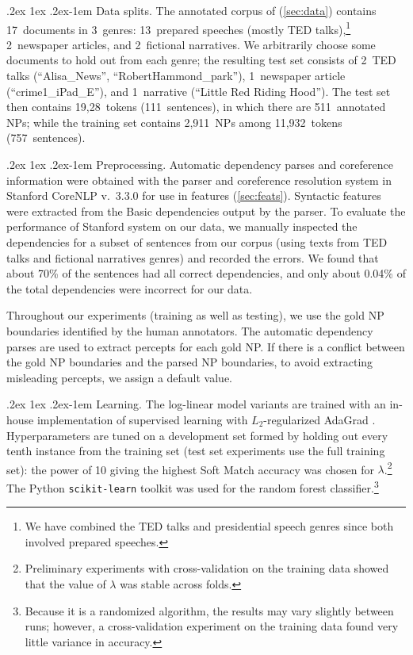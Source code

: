 \documentclass[11pt,letterpaper]{article}
\makeatletter
\renewcommand{\paragraph}{%
  \@startsection{paragraph}{4}%
  {\z@}{.2ex \@plus 1ex \@minus .2ex}{-1em}%
  {\normalfont\normalsize\bfseries}%
}
\makeatother
\begin{document}
\paragraph{Data splits.} The annotated corpus of \citet{bhatia14} (\cref{sec:data}) contains 17~documents 
in 3~genres: 13~prepared speeches (mostly TED talks),\footnote{We have combined the TED talks and presidential speech genres since both involved prepared speeches.} 2~newspaper articles, 
and 2~fictional narratives. We arbitrarily choose some documents to hold out from each genre; 
the resulting test set consists of 2~TED talks (``Alisa\_News'', ``RobertHammond\_park''), 
1~newspaper article (``crime1\_iPad\_E''), and 1~narrative (``Little Red Riding Hood'').
The test set then contains 19,28~tokens (111~sentences), in which there are 511~annotated NPs; 
while the training set contains 2,911~NPs among 11,932~tokens (757~sentences).

\paragraph{Preprocessing.} Automatic dependency parses and coreference information were obtained with 
the parser and coreference resolution system in Stanford CoreNLP v.~3.3.0 \citep{socher-13,recasens-13}
for use in features (\cref{sec:feats}). Syntactic features were extracted from the Basic dependencies output by the parser. 
To evaluate the performance of Stanford system on our data, 
we manually inspected the dependencies for a subset of sentences from our corpus (using texts from TED talks and fictional narratives genres) 
and recorded the errors. 
We found that about 70\% of the sentences had all correct dependencies, and only about 0.04\% of the total dependencies were incorrect for our data.

Throughout our experiments (training as well as testing), we use the gold NP boundaries identified by the human annotators.
The automatic dependency parses are used to extract percepts for each gold NP.     
If there is a conflict between the gold NP boundaries and the parsed NP boundaries, to avoid extracting misleading percepts, 
we assign a default value.  

\paragraph{Learning.} The log-linear model variants are trained with an in-house implementation of supervised learning with $L_2$-regularized AdaGrad \citep{adagrad}.
Hyperparameters are tuned  
on a development set formed by holding out every tenth instance from the training set 
(test set experiments use the full training set):
the power of 10 giving the highest Soft Match accuracy was chosen for $\lambda$.\footnote{Preliminary experiments with cross-validation on the training data showed that the value of $\lambda$ was stable across folds.}
The Python {\tt scikit-learn} toolkit \citep{scikit-learn} was used for the random forest classifier.\footnote{Because it is a randomized algorithm, the results may vary slightly between runs; 
however, a cross-validation experiment on the training data found very little variance in accuracy.}
\end{document}
